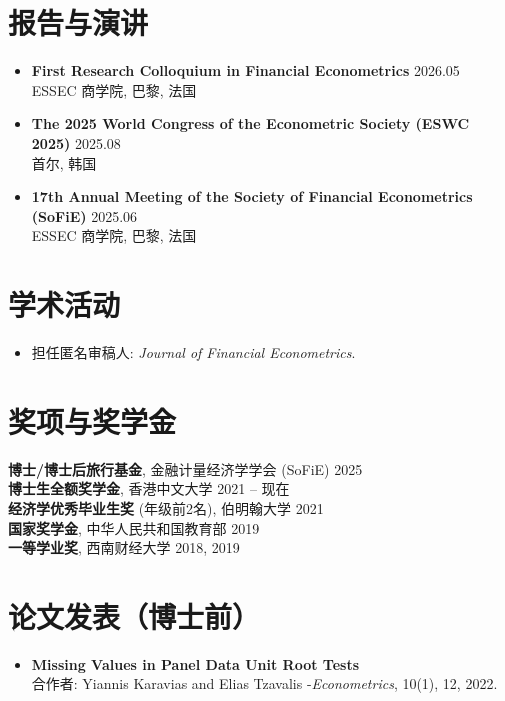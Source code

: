 \documentclass[11pt,a4paper]{article}
\begin{document}
\section{报告与演讲}

\begin{itemize}
    \item \textbf{First Research Colloquium in Financial Econometrics}  \hfill 2026.05 \\
    ESSEC 商学院, 巴黎, 法国

    \item \textbf{The 2025 World Congress of the Econometric Society (ESWC 2025)} \hfill 2025.08 \\
    首尔, 韩国
    
    \item \textbf{17th Annual Meeting of the Society of Financial Econometrics (SoFiE)} \hfill 2025.06 \\
     ESSEC 商学院, 巴黎, 法国
\end{itemize}

\section{学术活动}

\begin{itemize}
    \item 担任匿名审稿人: \textit{Journal of Financial Econometrics}. 
\end{itemize}

\section{奖项与奖学金}
\textbf{博士/博士后旅行基金}, 金融计量经济学学会 (SoFiE) \hfill 2025 \\
\textbf{博士生全额奖学金}, 香港中文大学 \hfill 2021 -- 现在 \\
\textbf{经济学优秀毕业生奖} (年级前2名), 伯明翰大学 \hfill 2021\\
\textbf{国家奖学金}, 中华人民共和国教育部 \hfill 2019\\
\textbf{一等学业奖}, 西南财经大学 \hfill 2018, 2019

\section{论文发表（博士前）}

\begin{itemize}
    \item \textbf{Missing Values in Panel Data Unit Root Tests} \\
    合作者: Yiannis Karavias and Elias Tzavalis -\textit{Econometrics}, 10(1), 12, 2022.
\end{itemize}
\end{document}
